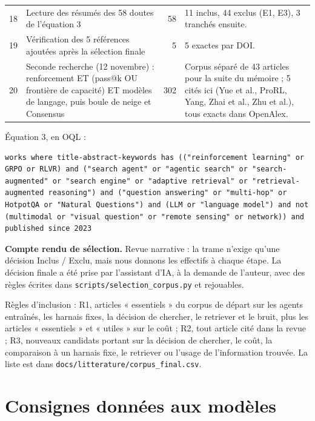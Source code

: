 \documentclass[11pt,a4paper]{article}
\begin{document}
\begin{small}
\begin{longtable}{@{}rp{6.4cm}rp{5.6cm}@{}}
18 & Lecture des résumés des 58 doutes de l'équation 3 & 58 & 11 inclus, 44 exclus (E1, E3), 3 tranchés ensuite.\\
19 & Vérification des 5 références ajoutées après la sélection finale & 5 & 5 exactes par DOI.\\
20 & Seconde recherche (12 novembre) : renforcement ET (pass@k OU frontière de capacité) ET modèles de langage, puis boule de neige et Consensus & 302 & Corpus séparé de 43 articles pour la suite du mémoire ; 5 cités ici (Yue et al., ProRL, Yang, Zhai et al., Zhu et al.), tous exacts dans OpenAlex.\\
\bottomrule
\end{longtable}
\end{small}

\noindent Équation 3, en OQL :
\begin{Verbatim}[breaklines, fontsize=\footnotesize]
works where title-abstract-keywords has (("reinforcement learning" or GRPO or RLVR) and ("search agent" or "agentic search" or "search-augmented" or "search engine" or "adaptive retrieval" or "retrieval-augmented reasoning") and ("question answering" or "multi-hop" or HotpotQA or "Natural Questions") and (LLM or "language model") and not (multimodal or "visual question" or "remote sensing" or network)) and published since 2023
\end{Verbatim}

\noindent\textbf{Compte rendu de sélection.} Revue narrative : la trame n'exige qu'une décision Inclus / Exclu, mais nous donnons les effectifs à chaque étape. La décision finale a été prise par l'assistant d'IA, à la demande de l'auteur, avec des règles écrites dans \texttt{scripts/selection\_corpus.py} et rejouables.

\begin{small}

\end{small}

\smallskip
\noindent Règles d'inclusion : R1, articles « essentiels » du corpus de départ sur les agents entraînés, les harnais fixes, la décision de chercher, le retriever et le bruit, plus les articles « essentiels » et « utiles » sur le coût ; R2, tout article cité dans la revue ; R3, nouveaux candidats portant sur la décision de chercher, le coût, la comparaison à un harnais fixe, le retriever ou l'usage de l'information trouvée. La liste est dans \texttt{docs/litterature/corpus\_final.csv}.

\section{Consignes données aux modèles}\label{ann:prompts}
\end{document}

